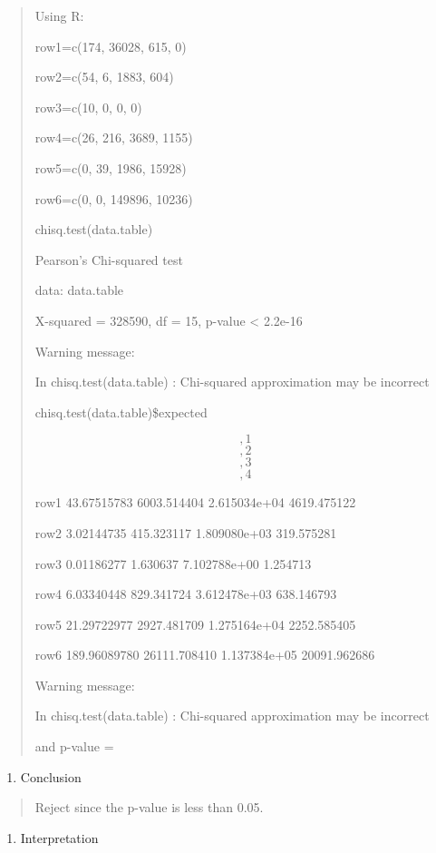 \documentclass[]{book}
\providecommand{\tightlist}{%
  \setlength{\itemsep}{0pt}\setlength{\parskip}{0pt}}
\begin{document}
\begin{quote}
Using R:

row1=c(174, 36028, 615, 0)

row2=c(54, 6, 1883, 604)

row3=c(10, 0, 0, 0)

row4=c(26, 216, 3689, 1155)

row5=c(0, 39, 1986, 15928)

row6=c(0, 0, 149896, 10236)

chisq.test(data.table)

Pearson's Chi-squared test

data: data.table

X-squared = 328590, df = 15, p-value \textless{} 2.2e-16

Warning message:

In chisq.test(data.table) : Chi-squared approximation may be incorrect

chisq.test(data.table)\$expected

\[,1\] \[,2\] \[,3\] \[,4\]

row1 43.67515783 6003.514404 2.615034e+04 4619.475122

row2 3.02144735 415.323117 1.809080e+03 319.575281

row3 0.01186277 1.630637 7.102788e+00 1.254713

row4 6.03340448 829.341724 3.612478e+03 638.146793

row5 21.29722977 2927.481709 1.275164e+04 2252.585405

row6 189.96089780 26111.708410 1.137384e+05 20091.962686

Warning message:

In chisq.test(data.table) : Chi-squared approximation may be incorrect

and p-value =
\end{quote}

\begin{enumerate}
\def\labelenumi{\arabic{enumi}.}
\setcounter{enumi}{3}
\tightlist
\item
  Conclusion
\end{enumerate}

\begin{quote}
Reject since the p-value is less than 0.05.
\end{quote}

\begin{enumerate}
\def\labelenumi{\arabic{enumi}.}
\setcounter{enumi}{4}
\tightlist
\item
  Interpretation
\end{enumerate}
\end{document}
